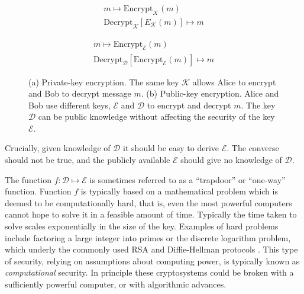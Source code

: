 \begin{figure}[htp]
\centering
\captionsetup{width=0.8\linewidth}
\begin{framed}
\begin{subfigure}{0.4\textwidth}
\begin{align*}
m \mapsto \text{Encrypt}_\mathcal{K}\left(m\right) \\
\text{Decrypt}_\mathcal{K}\left[E_\mathcal{K}\left(m\right)\right] \mapsto m
\end{align*}
\caption{}
\end{subfigure}
\begin{subfigure}{0.4\textwidth}
\begin{align*}
m \mapsto \text{Encrypt}_\mathcal{E}\left(m\right) \\
\text{Decrypt}_\mathcal{D}\left[\text{Encrypt}_\mathcal{E}\left(m\right)\right] \mapsto m
\end{align*}
\caption{}
\end{subfigure}
\caption{(a) Private-key encryption. The same key $\mathcal{K}$ allows Alice to encrypt and Bob to decrypt message $m$. (b) Public-key encryption. Alice and Bob use different keys, $\mathcal{E}$ and $\mathcal{D}$ to encrypt and decrypt $m$. The key $\mathcal{D}$ can be public knowledge without affecting the security of the key $\mathcal{E}$.}
\label{fig:pubpriv}
\end{framed}
\end{figure}

Crucially, given knowledge of $\mathcal{D}$ it should be easy to derive $\mathcal{E}$. The converse should not be true, and the publicly available $\mathcal{E}$ should give no knowledge of $\mathcal{D}$. %

The function $f: \mathcal{D} \mapsto \mathcal{E}$ is sometimes referred to as a ``trapdoor'' or ``one-way'' function. Function $f$ is typically based on a mathematical problem which is deemed to be computationally hard, that is, even the most powerful computers cannot hope to solve it in a feasible amount of time. Typically the time taken to solve scales exponentially in the size of the key. Examples of hard problems include factoring a large integer into primes or the discrete logarithm problem, which underly the commonly used RSA  and Diffie-Hellman protocols \cite{Rivest1978, Diffie1976, Schneier1996}. This type of security, relying on assumptions about computing power, is typically known as \emph{computational} security. In principle these cryptosystems could be broken with a sufficiently powerful computer, or with algorithmic advances.

